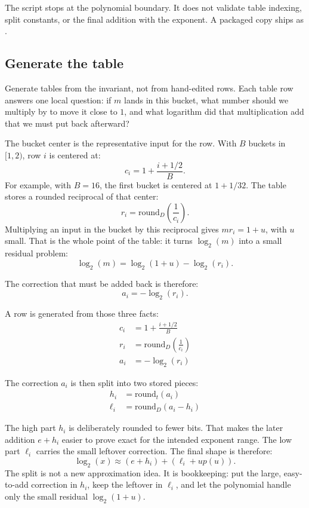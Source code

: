 \documentclass[manuscript, nonacm]{acmart}
\begin{document}
    The script stops at the polynomial boundary. It does not validate
    table indexing, split constants, or the final addition with the exponent.
    A packaged copy ships as
    .

    \subsection{Generate the table}

    Generate tables from the invariant, not from hand-edited rows. Each table row
    answers one local question: if $m$ lands in this bucket, what number should we
    multiply by to move it close to $1$, and what logarithm did that multiplication
    add that we must put back afterward?

    The bucket center is the representative input for the row. With $B$ buckets in
    $[1,2)$, row $i$ is centered at:
    \[ c_i = 1 + \frac{i + 1/2}{B}. \]
    For example, with $B=16$, the first bucket is centered at $1 + 1/32$.
    The table stores a rounded reciprocal of that center:
    \[ r_i = \mathrm{round}_D\!\left(\frac{1}{c_i}\right). \]
    Multiplying an input in the bucket by this reciprocal gives
    $m r_i = 1 + u$, with $u$ small. That is the whole point of the table: it turns
    $\log_2(m)$ into a small residual problem:
    \[
        \log_2(m) = \log_2(1 + u) - \log_2(r_i).
    \]

    The correction that must be added back is therefore:
    \[ a_i = -\log_2(r_i). \]

    A row is generated from those three facts:
    \begin{align*}
        c_i &= 1 + \frac{i + 1/2}{B} \\
        r_i &= \mathrm{round}_D\!\left(\frac{1}{c_i}\right) \\
        a_i &= -\log_2(r_i)
    \end{align*}

    The correction $a_i$ is then split into two stored pieces:
    \begin{align*}
        h_i &= \mathrm{round}_t(a_i) \\
        \ell_i &= \mathrm{round}_D(a_i - h_i)
    \end{align*}

    The high part $h_i$ is deliberately rounded to fewer bits. That makes the later
    addition $e + h_i$ easier to prove exact for the intended exponent range. The
    low part $\ell_i$ carries the small leftover correction. The final shape is
    therefore:
    \[
        \log_2(x) \approx (e + h_i) + (\ell_i + u p(u)).
    \]
    The split is not a new approximation idea. It is bookkeeping: put the large,
    easy-to-add correction in $h_i$, keep the leftover in $\ell_i$, and let the
    polynomial handle only the small residual $\log_2(1+u)$.
\end{document}

